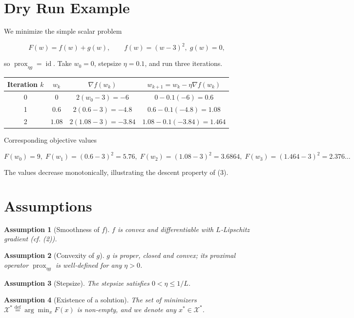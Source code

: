 \documentclass{article}
\newtheorem{assumption}{Assumption}
\newcommand{\prox}{\operatorname{prox}}
\begin{document}
\section*{Dry Run Example}
We minimize the simple scalar problem  

\[
F(w)=f(w)+g(w),\qquad f(w)=(w-3)^{2},\; g(w)=0,
\]

so $\prox_{\eta g}=\operatorname{id}$.  
Take $w_{0}=0$, stepsize $\eta=0.1$, and run three iterations.

\begin{center}
\begin{tabular}{c|c|c|c}
Iteration $k$ & $w_{k}$ & $\nabla f(w_{k})$ & $w_{k+1}=w_{k}-\eta\nabla f(w_{k})$ \\ \hline
0 & $0$ & $2(w_{0}-3)=-6$ & $0-0.1(-6)=0.6$ \\
1 & $0.6$ & $2(0.6-3)=-4.8$ & $0.6-0.1(-4.8)=1.08$ \\
2 & $1.08$ & $2(1.08-3)=-3.84$ & $1.08-0.1(-3.84)=1.464$ \\
\end{tabular}
\end{center}

Corresponding objective values  

\[
F(w_{0})=9,\;F(w_{1})=(0.6-3)^{2}=5.76,\;F(w_{2})=(1.08-3)^{2}=3.6864,\;
F(w_{3})=(1.464-3)^{2}=2.376\ldots
\]

The values decrease monotonically, illustrating the descent property of (3).

\newpage
\section*{Assumptions}
\begin{assumption}[Smoothness of $f$]\label{as:lip}
$f$ is convex and differentiable with $L$‑Lipschitz gradient (cf. (2)).
\end{assumption}
\begin{assumption}[Convexity of $g$]\label{as:g}
$g$ is proper, closed and convex; its proximal operator $\prox_{\eta g}$ is well‑defined for any $\eta>0$.
\end{assumption}
\begin{assumption}[Stepsize]\label{as:step}
The stepsize satisfies $0<\eta\le 1/L$.
\end{assumption}
\begin{assumption}[Existence of a solution]\label{as:sol}
The set of minimizers $\mathcal X^{*}\stackrel{\text{def}}{=}\arg\min_{x}F(x)$ is non‑empty, and we denote any $x^{*}\in\mathcal X^{*}$.
\end{assumption}
\end{document}
